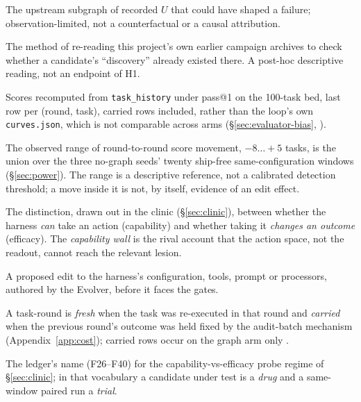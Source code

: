 \begin{description}[leftmargin=1.8em,labelsep=0.4em,itemsep=0.5pt,parsep=0pt,topsep=2pt]

\item[ancestor cone (cone)] The upstream subgraph of recorded $U$ that
could have shaped a failure; observation-limited, not a counterfactual or
a causal attribution.

\item[archaeology] The method of re-reading this project's own earlier
campaign archives to check whether a candidate's ``discovery'' already
existed there. A post-hoc descriptive reading, not an endpoint of H1.

\item[audited scores] Scores recomputed from \texttt{task\_history} under
pass@1 on the 100-task bed, last row per (round, task), carried rows
included, rather than the loop's own \texttt{curves.json}, which is not
comparable across arms (\S\ref{sec:evaluator-bias}, ).

\item[band (same-config band)] The observed range of round-to-round score
movement, $-8\ldots{+}5$ tasks, is the union over the three no-graph seeds'
twenty ship-free same-configuration windows (\S\ref{sec:power}). The range is a descriptive
reference, not a calibrated detection threshold; a move inside it is not, by
itself, evidence of an edit effect.

\item[capability vs efficacy] The distinction, drawn out in the clinic
(\S\ref{sec:clinic}), between whether the harness \emph{can} take an
action (capability) and whether taking it \emph{changes an outcome}
(efficacy). The \emph{capability wall} is the rival account that the
action space, not the readout, cannot reach the relevant lesion.

\item[candidate] A proposed edit to the harness's configuration, tools,
prompt or processors, authored by the Evolver, before it faces the gates.

\item[carried / fresh] A task-round is \emph{fresh} when the task was
re-executed in that round and \emph{carried} when the previous round's
outcome was held fixed by the audit-batch mechanism
(Appendix~\ref{app:cost}); carried rows occur on the graph arm only .

\item[the clinic] The ledger's name (F26--F40) for the capability-vs-efficacy
probe regime of \S\ref{sec:clinic}; in that vocabulary a candidate under
test is a \emph{drug} and a same-window paired run a \emph{trial}.


\end{description}
